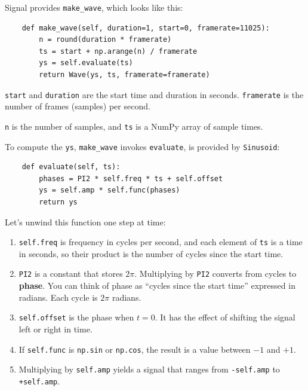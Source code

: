 \documentclass[12pt]{book}
\begin{document}
Signal provides \verb"make_wave", which looks like
this:

\begin{verbatim}
    def make_wave(self, duration=1, start=0, framerate=11025):
        n = round(duration * framerate)
        ts = start + np.arange(n) / framerate
        ys = self.evaluate(ts)
        return Wave(ys, ts, framerate=framerate)
\end{verbatim}

{\tt start} and {\tt duration} are the start time and duration
in seconds.  {\tt framerate} is the number of frames (samples)
per second.

{\tt n} is the number of samples, and {\tt ts} is a NumPy array
of sample times.

To compute the {\tt ys}, \verb"make_wave" invokes {\tt evaluate}, 
is provided by {\tt Sinusoid}:

\begin{verbatim}
    def evaluate(self, ts):
        phases = PI2 * self.freq * ts + self.offset
        ys = self.amp * self.func(phases)
        return ys
\end{verbatim}

Let's unwind this function one step at time:

\begin{enumerate}

\item {\tt self.freq} is frequency in cycles per second, and each
  element of {\tt ts} is a time in seconds, so their product is the
  number of cycles since the start time.

\item {\tt PI2} is a constant that stores $2 \pi$.  Multiplying by
  {\tt PI2} converts from cycles to {\bf phase}.  You can think of
  phase as ``cycles since the start time'' expressed in radians.  Each
  cycle is $2 \pi$ radians.

\item {\tt self.offset} is the phase when $t=0$.
  It has the effect of shifting the signal left or right in time.

\item If {\tt self.func} is {\tt np.sin} or {\tt np.cos}, the result is a
  value between $-1$ and $+1$.

\item Multiplying by {\tt self.amp} yields a signal that ranges from
  {\tt -self.amp} to {\tt +self.amp}.

\end{enumerate}
\end{document}
